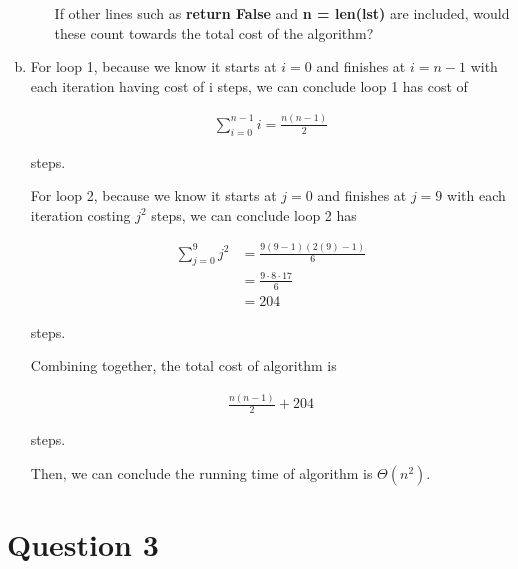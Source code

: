\documentclass[12pt]{article}
\begin{document}
\begin{enumerate}[a.]
\begin{itemize}
        If other lines such as \textbf{return False} and \textbf{n = len(lst)} are
        included, would these count towards the total cost of the algorithm?

    \end{itemize}

    \item

    For loop 1, because we know it starts at $i = 0$ and finishes at $i = n - 1$ with each
    iteration having cost of i steps, we can conclude loop 1 has cost of

    \setcounter{equation}{0}
    \begin{align}
        \sum\limits_{i=0}^{n-1} i = \frac{n(n-1)}{2}
    \end{align}

    steps.

    \bigskip

    For loop 2, because we know it starts at $j = 0$ and finishes at $j = 9$ with
    each iteration costing $j^2$ steps, we can conclude loop 2 has

    \begin{align}
        \sum\limits_{j=0}^{9} j^2 &= \frac{9(9-1)(2(9)-1)}{6}\\
        &= \frac{9 \cdot 8 \cdot 17}{6}\\
        &= 204
    \end{align}

    steps.

    \bigskip

    Combining together, the total cost of algorithm is

    \begin{align}
        \frac{n(n-1)}{2} + 204
    \end{align}

    steps.

    \bigskip

    Then, we can conclude the running time of algorithm is $\Theta(n^2)$.



\end{enumerate}

\section*{Question 3}
\end{document}

